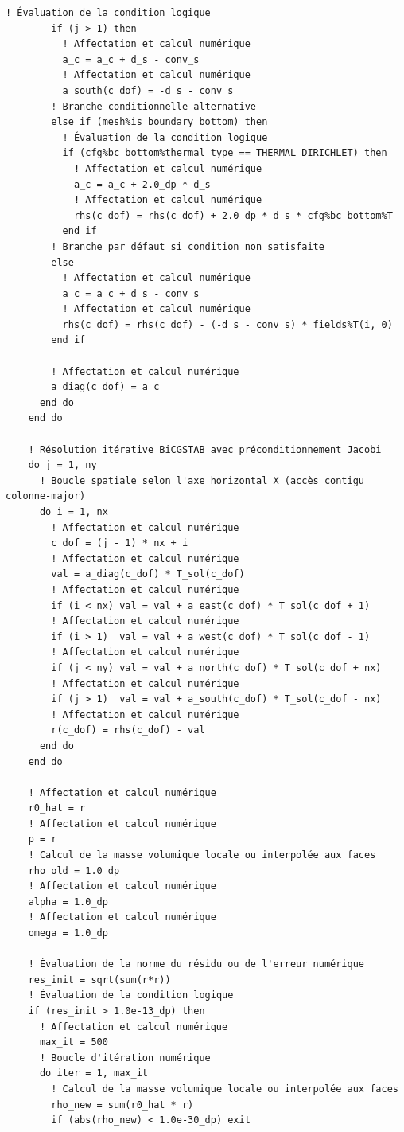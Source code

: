 \documentclass[10pt,a4paper,oneside]{book}
\begin{document}
\begin{lstlisting}[language={[95]Fortran}]
        ! Évaluation de la condition logique
        if (j > 1) then
          ! Affectation et calcul numérique
          a_c = a_c + d_s - conv_s
          ! Affectation et calcul numérique
          a_south(c_dof) = -d_s - conv_s
        ! Branche conditionnelle alternative
        else if (mesh%is_boundary_bottom) then
          ! Évaluation de la condition logique
          if (cfg%bc_bottom%thermal_type == THERMAL_DIRICHLET) then
            ! Affectation et calcul numérique
            a_c = a_c + 2.0_dp * d_s
            ! Affectation et calcul numérique
            rhs(c_dof) = rhs(c_dof) + 2.0_dp * d_s * cfg%bc_bottom%T
          end if
        ! Branche par défaut si condition non satisfaite
        else
          ! Affectation et calcul numérique
          a_c = a_c + d_s - conv_s
          ! Affectation et calcul numérique
          rhs(c_dof) = rhs(c_dof) - (-d_s - conv_s) * fields%T(i, 0)
        end if

        ! Affectation et calcul numérique
        a_diag(c_dof) = a_c
      end do
    end do

    ! Résolution itérative BiCGSTAB avec préconditionnement Jacobi
    do j = 1, ny
      ! Boucle spatiale selon l'axe horizontal X (accès contigu colonne-major)
      do i = 1, nx
        ! Affectation et calcul numérique
        c_dof = (j - 1) * nx + i
        ! Affectation et calcul numérique
        val = a_diag(c_dof) * T_sol(c_dof)
        ! Affectation et calcul numérique
        if (i < nx) val = val + a_east(c_dof) * T_sol(c_dof + 1)
        ! Affectation et calcul numérique
        if (i > 1)  val = val + a_west(c_dof) * T_sol(c_dof - 1)
        ! Affectation et calcul numérique
        if (j < ny) val = val + a_north(c_dof) * T_sol(c_dof + nx)
        ! Affectation et calcul numérique
        if (j > 1)  val = val + a_south(c_dof) * T_sol(c_dof - nx)
        ! Affectation et calcul numérique
        r(c_dof) = rhs(c_dof) - val
      end do
    end do

    ! Affectation et calcul numérique
    r0_hat = r
    ! Affectation et calcul numérique
    p = r
    ! Calcul de la masse volumique locale ou interpolée aux faces
    rho_old = 1.0_dp
    ! Affectation et calcul numérique
    alpha = 1.0_dp
    ! Affectation et calcul numérique
    omega = 1.0_dp

    ! Évaluation de la norme du résidu ou de l'erreur numérique
    res_init = sqrt(sum(r*r))
    ! Évaluation de la condition logique
    if (res_init > 1.0e-13_dp) then
      ! Affectation et calcul numérique
      max_it = 500
      ! Boucle d'itération numérique
      do iter = 1, max_it
        ! Calcul de la masse volumique locale ou interpolée aux faces
        rho_new = sum(r0_hat * r)
        if (abs(rho_new) < 1.0e-30_dp) exit


\end{lstlisting}
\end{document}
